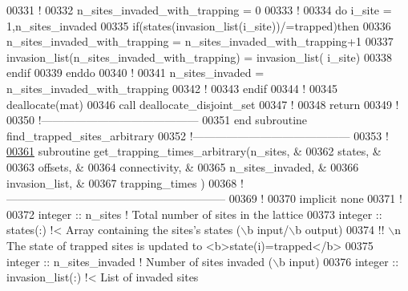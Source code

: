 \begin{DoxyCode}
00331        \textcolor{comment}{!}
00332        n\_sites\_invaded\_with\_trapping = 0
00333        \textcolor{comment}{!}
00334        \textcolor{keyword}{do} i\_site = 1,n\_sites\_invaded
00335           \textcolor{keyword}{if}(states(invasion\_list(i\_site))/=trapped)\textcolor{keyword}{then}
00336              n\_sites\_invaded\_with\_trapping = n\_sites\_invaded\_with\_trapping+1
00337              invasion\_list(n\_sites\_invaded\_with\_trapping) = invasion\_list(
      i\_site)
00338           \textcolor{keyword}{endif}
00339        \textcolor{keyword}{enddo}
00340        \textcolor{comment}{!}
00341        n\_sites\_invaded = n\_sites\_invaded\_with\_trapping
00342        \textcolor{comment}{!}
00343     \textcolor{keyword}{endif}
00344     \textcolor{comment}{!}
00345     \textcolor{keyword}{deallocate}(mat)
00346     call deallocate\_disjoint\_set
00347     \textcolor{comment}{!}
00348     return
00349     \textcolor{comment}{!}
00350   \textcolor{comment}{!------------------------------------------}
00351 \textcolor{keyword}{  end subroutine find\_trapped\_sites\_arbitrary}
00352   \textcolor{comment}{!------------------------------------------}
00353   \textcolor{comment}{!}
\hypertarget{module__trapping_8f90_source_l00361}{}\hyperlink{classmodule__trapping_acd41f4131aacecfd7ecbfd9846c13a9a}{00361}   \textcolor{keyword}{subroutine }get\_trapping\_times\_arbitrary(n\_sites,           &
00362                                           states,            &
00363                                           offsets,           &
00364                                           connectivity,      &
00365                                           n\_sites\_invaded,   &
00366                                           invasion\_list,     &
00367                                           trapping\_times     )
00368   \textcolor{comment}{!-----------------------------------------------------------}
00369     \textcolor{comment}{!}
00370     \textcolor{keyword}{implicit none}
00371     \textcolor{comment}{!}
00372     \textcolor{keywordtype}{integer} :: n\_sites \textcolor{comment}{! Total number of sites in the lattice}
00373     \textcolor{keywordtype}{integer} :: states(:) \textcolor{comment}{!< Array containing the sites's states (\(\backslash\)b input/\(\backslash\)b
       output)}
00374     \textcolor{comment}{!! \(\backslash\)n The state of trapped sites is updated to <b>state(i)=trapped</b>}
00375     \textcolor{keywordtype}{integer} :: n\_sites\_invaded \textcolor{comment}{! Number of sites invaded (\(\backslash\)b input)}
00376     \textcolor{keywordtype}{integer} :: invasion\_list(:) \textcolor{comment}{!< List of invaded sites }

\end{DoxyCode}
